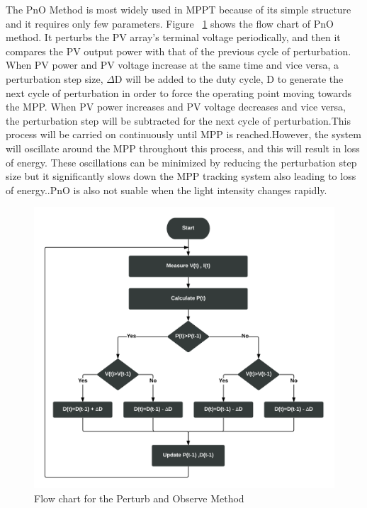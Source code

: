{  The \ac{PnO} Method is most widely used in \ac{MPPT} because of  its simple structure and it requires only few parameters. Figure ~\ref{fig:PnO_flow}  shows the flow chart of \ac{PnO} method. It perturbs the PV array's terminal voltage periodically, and then it compares the PV output power with that of the previous cycle of perturbation. When PV power and PV voltage increase at the same time and vice versa, a perturbation step size, ${\Delta}$D will be added to the duty cycle, D to generate the next cycle of   perturbation in order to force the operating point moving towards the \ac{MPP}. When PV power increases and PV voltage decreases and vice versa, the perturbation step will be subtracted for the next cycle of perturbation.This process will be carried on continuously until \ac{MPP} is reached.However, the system will oscillate around the \ac{MPP} throughout this process, and this will result in loss of energy. These oscillations can be minimized by reducing the perturbation step size but it significantly slows down the \ac{MPP} tracking system also leading to loss of energy.\cite{ngan2011study}.\ac{PnO} is also not suable when the light intensity changes rapidly. \\
  
  \begin{figure}[H]
    \begin{center}
    \includegraphics[width=\textwidth]{images/pno_flow}
    \caption{ Flow chart for the Perturb and Observe Method }
    \label{fig:PnO_flow}
    \end{center}
    \end{figure}
  
}
